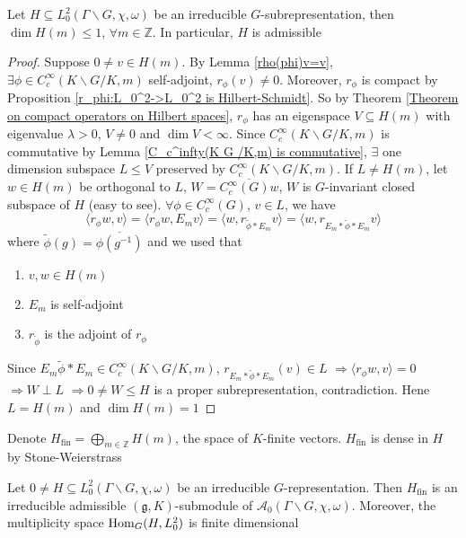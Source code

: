 \documentclass[../main.tex]{subfiles}
\begin{document}
\begin{proposition}\label{H<=L_0^2 irreducible, then dim H(m)<=1}
Let $H\subseteq L_0^2(\Gamma\backslash G,\chi,\omega)$ be an irreducible $G$-subrepresentation, then $\dim H(m)\leq1$, $\forall m\in\mathbb Z$. In particular, $H$ is admissible
\end{proposition}

\begin{proof}
Suppose $0\neq v\in H(m)$. By Lemma \ref{rho(phi)v=v}, $\exists\phi\in C_c^\infty(K\backslash G/K,m)$ self-adjoint, $r_\phi(v)\neq0$. Moreover, $r_\phi$ is compact by Proposition \ref{r_phi:L_0^2->L_0^2 is Hilbert-Schmidt}. So by Theorem \ref{Theorem on compact operators on Hilbert spaces}, $r_\phi$ has an eigenspace $V\subseteq H(m)$ with eigenvalue $\lambda>0$, $V\neq0$ and $\dim V<\infty$. Since $C_c^\infty(K\backslash G/K,m)$ is commutative by Lemma \ref{C_c^infty(K G /K,m) is commutative}, $\exists$ one dimension subspace $L\leq V$ preserved by $C_c^\infty(K\backslash G/K,m)$. If $L\neq H(m)$, let $w\in H(m)$ be orthogonal to $L$, $W=\overline{C_c^\infty(G)w}$, $W$ is $G$-invariant closed subspace of $H$ (easy to see). $\forall\phi\in C_c^\infty(G)$, $v\in L$, we have
\[\langle r_\phi w,v\rangle=\langle r_\phi w,E_mv\rangle=\langle w,r_{\tilde\phi*E_m}v\rangle=\langle w,r_{E_m*\tilde\phi*E_m}v\rangle\]
where $\tilde\phi(g)=\overline{\phi(g^{-1})}$ and we used that
\begin{enumerate}
\item $v,w\in H(m)$
\item $E_m$ is self-adjoint
\item $r_{\tilde\phi}$ is the adjoint of $r_\phi$
\end{enumerate}
Since $E_m\tilde\phi*E_m\in C_c^\infty(K\backslash G/K,m)$, $r_{E_m*\tilde\phi*E_m}(v)\in L$ $\Rightarrow\langle r_\phi w,v\rangle=0$ $\Rightarrow W\perp L$ $\Rightarrow 0\neq W\leq H$ is a proper subrepresentation, contradiction. Hene $L=H(m)$ and $\dim H(m)=1$
\end{proof}

Denote $H_{\mathrm{fin}}=\bigoplus_{m\in\mathbb Z}H(m)$, the space of $K$-finite vectors. $H_{\mathrm{fin}}$ is dense in $H$ by Stone-Weierstrass

\begin{theorem}
Let $0\neq H\subseteq L_0^2(\Gamma\backslash G,\chi,\omega)$ be an irreducible $G$-representation. Then $H_{\mathrm{fin}}$ is an irreducible admissible $(\mathfrak g,K)$-submodule of $\mathcal A_0(\Gamma\backslash G,\chi,\omega)$. Moreover, the multiplicity space $\operatorname{Hom}_G(H,L_0^2)$ is finite dimensional
\end{theorem}
\end{document}
